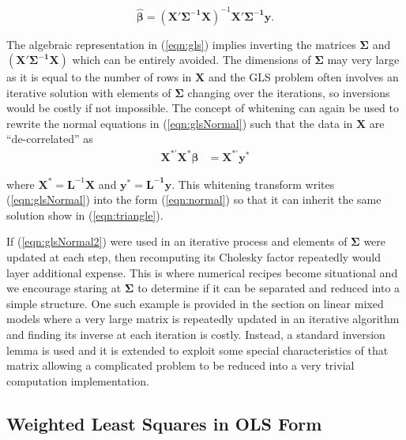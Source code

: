 \documentclass[12pt]{article}
\begin{document}
\begin{equation}
\label{eqn:gls}
\widehat{\bm{\beta}} = \bm{(X'\Sigma^{-1}X)}^{-1} \bm{X'\Sigma^{-1}y}.
\end{equation}

The algebraic representation in (\ref{eqn:gls}) implies inverting the matrices $\bm{\Sigma}$ and $\bm{(X'\Sigma^{-1}X)}$ which can be entirely avoided. The dimensions of $\bm{\Sigma}$ may very large as it is equal to the number of rows in $\bm{X}$ and the GLS problem often involves an iterative solution with elements of $\bm{\Sigma}$ changing over the iterations, so inversions would be costly if not impossible. The concept of whitening can again be used to rewrite the normal equations in (\ref{eqn:glsNormal}) such that the data in $\bm{X}$ are ``de-correlated'' as 
\begin{align}
\bm{X^{*'}X^{*}}\bm{\beta}		&= \bm{X^{*'}y^{*}}  \label{eqn:glsNormal2}
\end{align}

\noindent where $\bm{X}^{*} = \bm{L}^{-1}\bm{X}$ and $\bm{y}^* = \bm{L^{-1}}\bm{y}$. This whitening transform writes (\ref{eqn:glsNormal}) into the form (\ref{eqn:normal}) so that it can inherit the same solution show in (\ref{eqn:triangle}). 

If (\ref{eqn:glsNormal2}) were used in an iterative process and elements of $\bm{\Sigma}$ were updated at each step, then recomputing its Cholesky factor repeatedly would layer additional expense. This is where numerical recipes become situational and we encourage staring at $\bm{\Sigma}$ to determine if it can be separated and reduced into a simple structure. One such example is provided in the section on linear mixed models where a very large matrix is repeatedly updated in an iterative algorithm and finding its inverse at each iteration is costly. Instead, a standard inversion lemma is used and it is extended to exploit some special characteristics of that matrix allowing a complicated problem to be reduced into a very trivial computation implementation. 

\subsection*{Weighted Least Squares in OLS Form}
\end{document}
